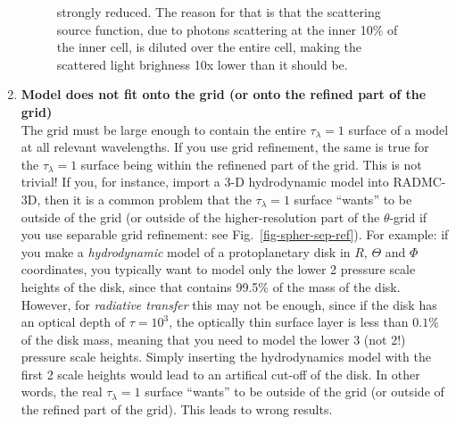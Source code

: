 \documentclass{report}
\begin{document}
\begin{enumerate}
\begin{figure}
{      strongly reduced.  The reason for that is that the scattering source
      function, due to photons scattering at the inner 10\% of the inner
      cell, is diluted over the entire cell, making the scattered light
      brighness 10x lower than it should be.}
  \end{figure}
\item {\bf Model does not fit onto the grid (or onto the refined part of the grid)}\\
  The grid must be large enough to contain the entire $\tau_\lambda=1$
  surface of a model at all relevant wavelengths. If you use grid
  refinement, the same is true for the $\tau_\lambda=1$ surface being within
  the refinened part of the grid. This is not trivial!  If you, for
  instance, import a 3-D hydrodynamic model into RADMC-3D, then it is a
  common problem that the $\tau_\lambda=1$ surface ``wants'' to be outside
  of the grid (or outside of the higher-resolution part of the $\theta$-grid
  if you use separable grid refinement: see
  Fig.~\ref{fig-spher-sep-ref}). For example: if you make a {\em
    hydrodynamic} model of a protoplanetary disk in $R$, $\Theta$ and $\Phi$
  coordinates, you typically want to model only the lower 2 pressure scale
  heights of the disk, since that contains 99.5\% of the mass of the
  disk. However, for {\em radiative transfer} this may not be enough, since
  if the disk has an optical depth of $\tau=10^3$, the optically thin
  surface layer is less than $0.1\%$ of the disk mass, meaning that you need
  to model the lower 3 (not 2!) pressure scale heights. Simply inserting the
  hydrodynamics model with the first 2 scale heights would lead to an
  artifical cut-off of the disk. In other words, the real $\tau_\lambda=1$
  surface ``wants'' to be outside of the grid (or outside of the refined
  part of the grid). This leads to wrong results.
\end{enumerate}
\end{document}
